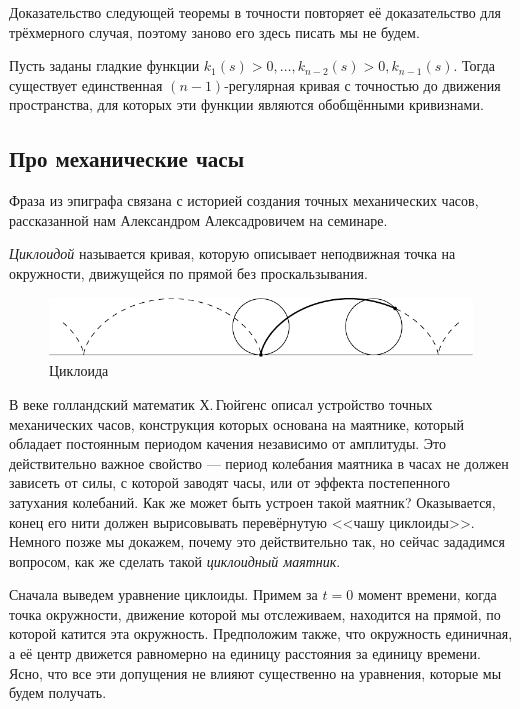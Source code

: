 Доказательство следующей теоремы в точности повторяет её доказательство для трёхмерного случая, поэтому заново его здесь писать мы не будем.

\begin{theorem}
	Пусть заданы гладкие функции $k_1(s) > 0, \ldots, k_{n - 2}(s) > 0, k_{n - 1}(s)$. Тогда существует единственная $(n - 1)$-регулярная кривая с точностью до движения пространства, для которых эти функции являются обобщёнными кривизнами.
\end{theorem}

\subsection{Про механические часы}

Фраза из эпиграфа связана с историей создания точных механических часов, рассказанной нам Александром Алексадровичем на семинаре.

\textit{Циклоидой} называется кривая, которую описывает неподвижная точка на окружности, движущейся по прямой без проскальзывания.

\begin{figure}[H]
	\centering
	\includegraphics[width=12cm]{./img/Cycloid.pdf}
	\caption{Циклоида}
\end{figure}

В  веке голландский математик\footnotemark{} Х.\,Гюйгенс описал устройство точных механических часов, конструкция которых основана на маятнике, который обладает постоянным периодом качения независимо от амплитуды. Это действительно важное свойство --- период колебания маятника в часах не должен зависеть от силы, с которой заводят часы, или от эффекта постепенного затухания колебаний. Как же может быть устроен такой маятник? Оказывается, конец его нити должен вырисовывать перевёрнутую <<чашу циклоиды>>. Немного позже мы докажем, почему это действительно так, но сейчас зададимся вопросом, как же сделать такой \textit{циклоидный маятник}.


Сначала выведем уравнение циклоиды. Примем за $t = 0$ момент времени, когда точка окружности, движение которой мы отслеживаем, находится на прямой, по которой катится эта окружность. Предположим также, что окружность единичная, а её центр движется равномерно на единицу расстояния за единицу времени. Ясно, что все эти допущения не влияют существенно на уравнения, которые мы будем получать.


